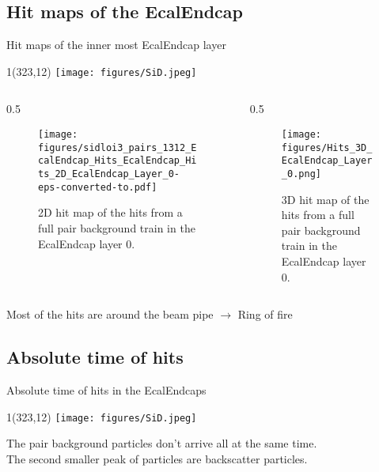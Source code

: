 \documentclass[xcolor={dvipsnames}]{beamer}
\newcommand{\sidlogo}{
  \setlength{\TPHorizModule}{1pt}
  \setlength{\TPVertModule}{1pt}
  \begin{textblock}{1}(323,12)
   \texttt{[image: figures/SiD.jpeg]}
  \end{textblock}
  }
\begin{document}
\subsection{Hit maps of the EcalEndcap}
\begin{frame}{Hit maps of the inner most EcalEndcap layer}
\sidlogo
\begin{columns}[T]
\begin{column}[b]{0.5\textwidth}
 \begin{figure}
\centering
\texttt{[image: figures/sidloi3\_pairs\_1312\_EcalEndcap\_Hits\_EcalEndcap\_Hits\_2D\_EcalEndcap\_Layer\_0-eps-converted-to.pdf]}
\caption{\small 2D hit map of the hits from a full pair background train in the EcalEndcap layer 0.}
\end{figure}
\end{column}
\begin{column}[b]{0.5\textwidth}
 \begin{figure}
\centering
\texttt{[image: figures/Hits\_3D\_EcalEndcap\_Layer\_0.png]}
\caption{\small 3D hit map of the hits from a full pair background train in the EcalEndcap layer 0.}
\end{figure}
\end{column}
\end{columns}
Most of the hits are around the beam pipe $\rightarrow$ Ring of fire
\end{frame}

\subsection{Absolute time of hits}
\begin{frame}{Absolute time of hits in the EcalEndcaps}
\sidlogo
{}
The pair background particles don't arrive all at the same time.\\
The second smaller peak of particles are backscatter particles.
\end{frame} 
\end{document}
